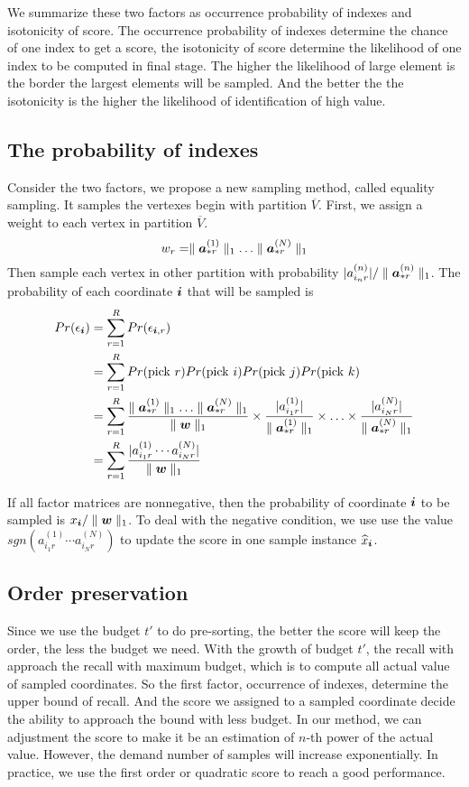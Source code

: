 \documentclass{article}
\newcommand{\Sca}[3]{{#1}^{(#2)}_{i_#2#3}}%
\newcommand{\V}[1]{{\bm{{\MakeLowercase{#1}}}}}%
\newcommand{\Vacol}[1]{\V{a}^{(#1)}_{*r}}
\newcommand{\norm}[2]{\parallel#1\parallel_{#2}}
\begin{document}
We summarize these two factors as occurrence probability of indexes and isotonicity of score. The occurrence probability of indexes determine the chance of one index to get a score, the isotonicity of score determine the likelihood of one index to be computed in final stage. The higher the likelihood of large element is the border the largest elements will be sampled. And the better the the isotonicity is the higher the likelihood of identification of high value.
\subsection{The probability of indexes}
Consider the two factors, we propose a new sampling method, called equality sampling. It samples the vertexes begin with partition $\overline{V}$. First, we assign a weight to each vertex in partition $\overline{V}$.
\[
    w_r = \norm{\Vacol{1}}{1}\ldots\norm{\Vacol{N}}{1}
\]
Then sample each vertex in other partition with probability $|\Sca{a}{n}{r}|/\norm{\Vacol{n}}{1}$. The probability of each coordinate $\V{i}$ that will be sampled is
\begin{align*}
Pr(\epsilon_{\V{i}}) &= \sum_{r=1}^{R} Pr(\epsilon_{\V{i},r})\\
&= \sum_{r=1}^{R} Pr({\rm pick\ }r)Pr({\rm pick\ }i)Pr({\rm pick\ }j)Pr({\rm pick\ }k)\\
&= \sum_{r=1}^{R} \frac{\norm{\Vacol{1}}{1}\ldots\norm{\Vacol{N}}{1}}{\norm{\V{W}}{1}}\times \frac{|\Sca{a}{1}{r}|}{\norm{\Vacol{1}}{1}} \times\ldots\times \frac{|\Sca{a}{N}{r}|}{\norm{\Vacol{N}}{1}} \\
& = \sum_{r=1}^{R} \frac{|\Sca{a}{1}{r}\cdots\Sca{a}{N}{r}|}{\norm{\V{W}}{1}}
\end{align*}

If all factor matrices are nonnegative, then the probability of coordinate $\V{i}$ to be sampled is $x_{\V{i}}/\norm{\V{w}}{1}$. To deal with the negative condition, we use use the value $sgn(\Sca{a}{1}{r}\cdots\Sca{a}{N}{r})$ to update the score in one sample instance $\widehat{x}_{\V{i}}$.

\subsection{Order preservation}

Since we use the budget $t'$ to do pre-sorting, the better the score will keep the order, the less the budget we need. With the growth of budget $t'$, the recall with approach the recall with maximum budget, which is to compute all actual value of sampled coordinates. So the first factor, occurrence of indexes, determine the upper bound of recall. And the score we assigned to a sampled coordinate decide the ability to approach the bound with less budget. In our method, we can adjustment the score to make it be an estimation of $n$-th power of the actual value. However, the demand number of samples will increase exponentially. In practice, we use the first order or quadratic score to reach a good performance.
\end{document}
